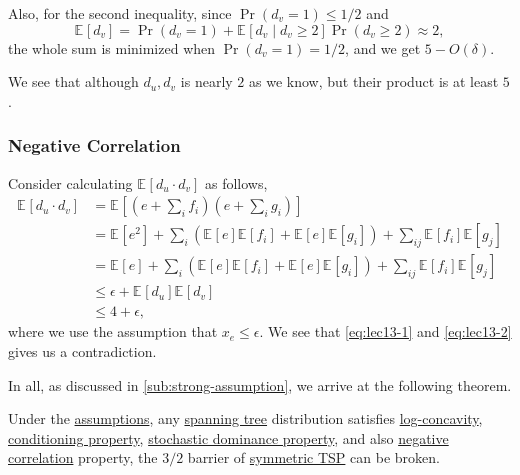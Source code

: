 Also, for the second inequality, since \(\Pr(d_v = 1) \leq 1 / 2\) and
\[
	\mathbb{E}_{}\left[d_v \right] = \Pr(d_v = 1) + \mathbb{E}_{}\left[ d_v \mid d_v \geq 2 \right] \Pr(d_v \geq 2)\approx 2,
\]
the whole sum is minimized when \(\Pr(d_v = 1) = 1 / 2\), and we get \(5 - O(\delta )\).

\begin{remark}
	We see that although \(d_u, d_v\) is nearly \(2\) as we know, but their product is at least \(5\).
\end{remark}

\subsubsection{Negative Correlation}\label{subsub:negative-correlation}
Consider calculating \(\mathbb{E}_{}\left[d_u \cdot d_v \right] \) as follows,
\begin{equation}\label{eq:lec13-2}
	\begin{split}
		\mathbb{E}_{}\left[d_u \cdot d_v \right]
		&= \mathbb{E}_{}\left[\left( e + \sum_{i} f_i \right) \left( e + \sum_{i} g_i \right)  \right] \\
		&= \mathbb{E}_{}\left[e^{2} \right] + \sum_{i} \left( \mathbb{E}_{}\left[e \right] \mathbb{E}_{}\left[f_i \right] + \mathbb{E}_{}\left[e \right] \mathbb{E}_{}\left[g_i \right]   \right) + \sum_{ij} \mathbb{E}_{}\left[f_i \right] \mathbb{E}_{}\left[g_j \right]\\
		&= \mathbb{E}_{}\left[e \right] + \sum_{i} \left( \mathbb{E}_{}\left[e \right] \mathbb{E}_{}\left[f_i \right] + \mathbb{E}_{}\left[e \right] \mathbb{E}_{}\left[g_i \right]   \right) + \sum_{ij} \mathbb{E}_{}\left[f_i \right] \mathbb{E}_{}\left[g_j \right] \\
		&\leq \epsilon + \mathbb{E}_{}\left[ d_u \right] \mathbb{E}_{}\left[d_v \right] \\
		&\leq 4 + \epsilon,
	\end{split}
\end{equation}
where we use the assumption that \(x_e \leq \epsilon \). We see that \autoref{eq:lec13-1} and \autoref{eq:lec13-2} gives us a contradiction.

In all, as discussed in \autoref{sub:strong-assumption}, we arrive at the following theorem.

\begin{theorem}
	Under the \hyperref[sub:strong-assumption]{assumptions}, any \hyperref[def:spanning-tree]{spanning tree} distribution satisfies \hyperref[subsub:log-concavity]{log-concavity}, \hyperref[subsub:conditioning]{conditioning property}, \hyperref[subsub:stochastic-dominance]{stochastic dominance property}, and also \hyperref[subsub:negative-correlation]{negative correlation} property, the \(3 / 2\) barrier of \hyperref[prb:STSP]{symmetric TSP} can be broken.
\end{theorem}

